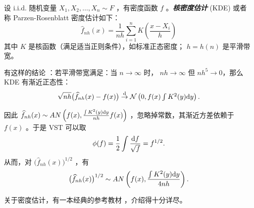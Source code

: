\begin{example}
设 i.i.d. 随机变量 $X_1,X_2,\dots,X_n\sim F$ ，有密度函数 $f$ 。\textbf{\emph{核密度估计 }} (KDE) 或者称 Parzen-Rosenblatt 密度估计如下：
\[\widehat{f}_{nh}(x) = \frac{1}{nh}\sum_{i=1}^n K\!\left(\frac{x-X_i}{h}\right)\]
其中 $K$ 是核函数（满足适当正则条件），如标准正态密度； $h=h(n)$ 是平滑带宽。

有这样的结论 \cite{parzen1962}：若平滑带宽满足：当 $n\to\infty$ 时， $nh\to \infty$ 但 $nh^5\to 0$，那么KDE 有渐近正态性：
\[
\sqrt{nh}\big(\widehat f_{nh}(x)-f(x)\big)\overset{\rm d}\to \mathcal N\left(0, {\textstyle f(x)\int K^2(y){\rm d}y}\right).
\]

因此 $\widehat{f}_{nh}(x)\sim AN\left(f(x), \textstyle{\frac{\int K^2(y){\rm d}y}{nh}f(x)}\right)$ ，忽略掉常数，其渐近方差依赖于 $f(x)$ 。于是 VST 可以取
\[
\phi(f) =\frac12 \int \frac{{\rm d}f}{\sqrt{f}} = f^{1/2}.
\]
从而，对 $\big(\widehat{f}_{nh}(x)\big)^{1/2}$ ，有
\[
\big(\widehat{f}_{nh}(x)\big)^{1/2}\sim AN\left(f(x), \frac{\int K^2(y){\rm d}y}{4nh}\right).
\]

\end{example}

关于密度估计，有一本经典的参考教材 \cite{silverman1986}，介绍得十分详尽。

